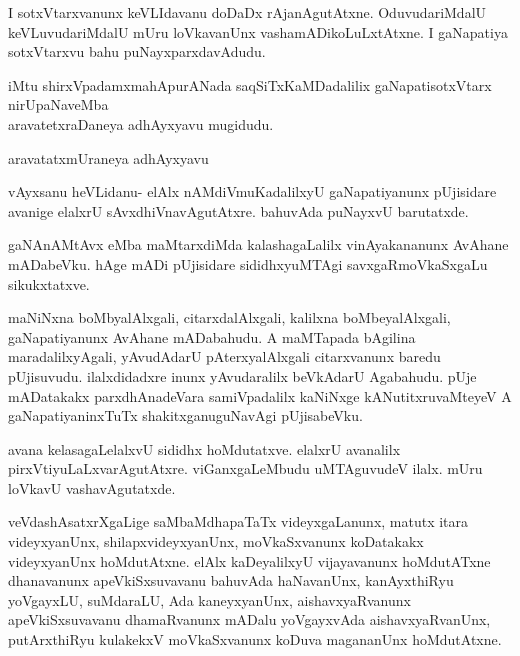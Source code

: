 \documentclass{article}
\begin{document}
\begin{mng}%
I sotxVtarxvanunx keVLIdavanu doDaDx rAjanAgutAtxne. OduvudariMdalU keVLuvudariMdalU mUru loVkavanUnx vashamADikoLuLxtAtxne. I gaNapatiya sotxVtarxvu bahu puNayxparxdavAdudu.
\end{mng}

\begin{center}
iMtu shirxVpadamxmahApurANada saqSiTxKaMDadalilix gaNapatisotxVtarx nirUpaNaveMba\\
aravatetxraDaneya adhAyxyavu mugidudu.
\end{center}

\begin{center}
{\textbf\large{aravatatxmUraneya adhAyxyavu}}
\end{center}

\begin{mng}%
vAyxsanu heVLidanu- elAlx nAMdiVmuKadalilxyU gaNapatiyanunx pUjisidare avanige elalxrU sAvxdhiVnavAgutAtxre. bahuvAda puNayxvU barutatxde.
\end{mng}

\begin{mng}%
gaNAnAMtAvx eMba maMtarxdiMda kalashagaLalilx vinAyakananunx AvAhane mADabeVku. hAge mADi pUjisidare sididhxyuMTAgi savxgaRmoVkaSxgaLu sikukxtatxve.
\end{mng}

\begin{mng}%
maNiNxna boMbyalAlxgali, citarxdalAlxgali, kalilxna boMbeyalAlxgali, gaNapatiyanunx AvAhane mADabahudu. A maMTapada bAgilina maradalilxyAgali, yAvudAdarU pAterxyalAlxgali citarxvanunx baredu pUjisuvudu. ilalxdidadxre inunx yAvudaralilx beVkAdarU Agabahudu. pUje mADatakakx parxdhAnadeVara samiVpadalilx kaNiNxge kANutitxruvaMteyeV A gaNapatiyaninxTuTx shakitxganuguNavAgi pUjisabeVku.
\end{mng}

\begin{mng}%
avana kelasagaLelalxvU sididhx hoMdutatxve. elalxrU avanalilx pirxVtiyuLaLxvarAgutAtxre. viGanxgaLeMbudu uMTAguvudeV ilalx. mUru loVkavU vashavAgutatxde.
\end{mng}

\begin{mng}%
veVdashAsatxrXgaLige saMbaMdhapaTaTx videyxgaLanunx, matutx itara videyxyanUnx, shilapxvideyxyanUnx, moVkaSxvanunx koDatakakx videyxyanUnx hoMdutAtxne. elAlx kaDeyalilxyU vijayavanunx hoMdutATxne dhanavanunx apeVkiSxsuvavanu bahuvAda haNavanUnx, kanAyxthiRyu yoVgayxLU, suMdaraLU, Ada kaneyxyanUnx, aishavxyaRvanunx apeVkiSxsuvavanu dhamaRvanunx mADalu yoVgayxvAda aishavxyaRvanUnx, putArxthiRyu kulakekxV moVkaSxvanunx koDuva magananUnx hoMdutAtxne.
\end{mng}
\end{document}
